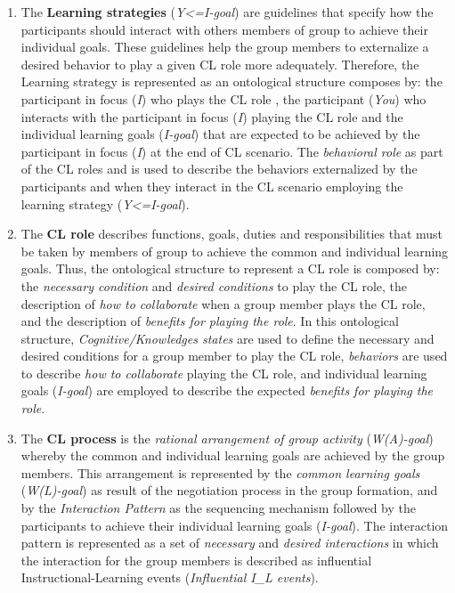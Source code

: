 \begin{enumerate} [label=(\alph*)]

\item
The \textbf{Learning strategies} (\emph{Y<=I-goal}) are guidelines that specify how the participants should interact with others members of group to achieve their individual goals. These guidelines help the group members to externalize a desired behavior to play a given CL role more adequately. Therefore, the Learning strategy is represented as an ontological structure composes by: the participant in focus (\emph{I}) who plays the CL role , the participant (\emph{You}) who interacts with the participant in focus (\emph{I}) playing the CL role  and the individual learning goals (\emph{I-goal}) that are expected to be achieved by the participant in focus (\emph{I}) at the end of CL scenario. The \emph{behavioral role} as part of the CL roles  and  is used to describe the behaviors externalized by the participants  and  when they interact in the CL scenario employing the learning strategy (\emph{Y<=I-goal}).

\item
The \textbf{CL role} describes functions, goals, duties and responsibilities that must be taken by members of group to achieve the common and individual learning goals. Thus, the ontological structure to represent a CL role is composed by: the \emph{necessary condition} and \emph{desired conditions} to play the CL role, the description of \emph{how to collaborate} when a group member plays the CL role, and the description of \emph{benefits for playing the role}. In this ontological structure, \emph{Cognitive/Knowledges states} are used to define the necessary and desired conditions for a group member to play the CL role, \emph{behaviors} are used to describe \emph{how to collaborate} playing the CL role, and individual learning goals (\emph{I-goal}) are employed to describe the expected \emph{benefits for playing the role}.

\item
The \textbf{CL process} is the \emph{rational arrangement of group activity} (\emph{W(A)-goal}) whereby the common and individual learning goals are achieved by the group members. This arrangement is represented by the \emph{common learning goals} (\emph{W(L)-goal}) as result of the negotiation process in the group formation, and by the \emph{Interaction Pattern} as the sequencing mechanism followed by the participants to achieve their individual learning goals (\emph{I-goal}). The interaction pattern is represented as a set of \emph{necessary} and \emph{desired interactions} in which the interaction for the group members is described as influential Instructional-Learning events (\emph{Influential I\_L events}).


\end{enumerate}
